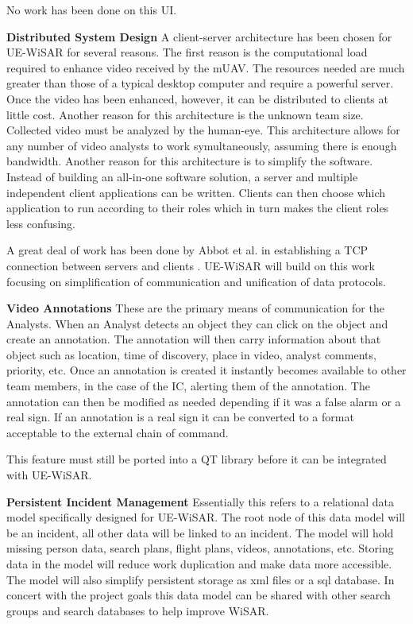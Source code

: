 \documentclass[12pt]{IEEEtran}
\begin{document}
No work has been done on this UI.

\textbf{Distributed System Design}  A client-server architecture has been chosen
for UE-WiSAR for several reasons.  The first reason is the computational load
required to enhance video received by the mUAV.  The resources needed are much
greater than those of a typical desktop computer and require a powerful server. 
Once the video has been enhanced, however, it can be distributed to clients at
little cost.  Another reason for this architecture is the unknown team size. 
Collected video must be analyzed by the human-eye.  This architecture allows for
any number of video analysts to work symultaneously, assuming there is enough bandwidth.
Another reason for this architecture is to simplify the software.  Instead of
building an all-in-one software solution, a server and multiple independent
client applications can be written.  Clients can then choose which application
to run according to their roles which in turn makes the client roles less
confusing.

A great deal of work has been done by Abbot et al. in establishing a TCP
connection between servers and clients \cite{serverCode}.  UE-WiSAR will build
on this work focusing on simplification of communication and unification of data protocols.

\textbf{Video Annotations}  These are the primary means of communication for the
Analysts.  When an Analyst detects an object they can click on the object and
create an annotation.  The annotation will then carry information about that
object such as location, time of discovery, place in video, analyst comments,
priority, etc.  Once an annotation is created it instantly becomes
available to other team members, in the case of the IC, alerting them of the
annotation.  The annotation can then be modified as needed depending if it was a
false alarm or a real sign.  If an annotation is a real sign it can be converted
to a format acceptable to the external chain of command.

This feature must still be ported into a QT library before it can be integrated
with UE-WiSAR.

\textbf{Persistent Incident Management}  Essentially this refers to a relational
data model specifically designed for UE-WiSAR.  The root node of this data model
will be an incident, all other data will be linked to an incident.  The model
will hold missing person data, search plans, flight plans, videos, annotations,
etc.  Storing data in the model will reduce work duplication and make
data more accessible.  The model will also simplify persistent storage as xml
files or a sql database.  In concert with the project goals this data model can
be shared with other search groups and search databases to help improve WiSAR.
\end{document}
